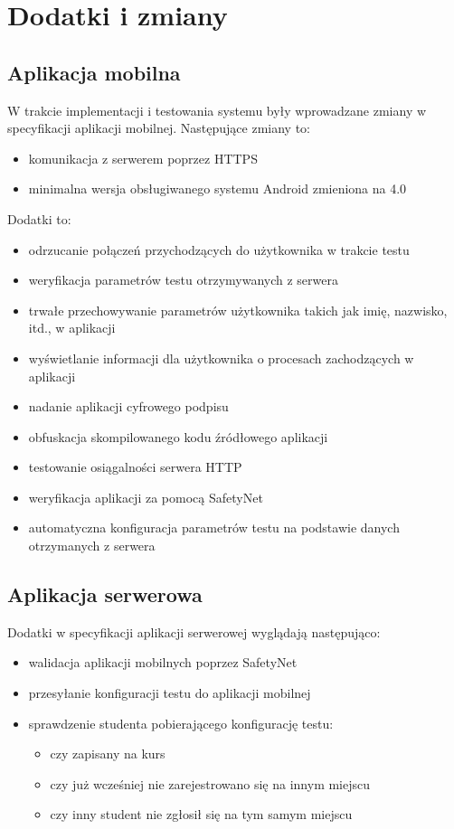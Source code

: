 \documentclass[eng]{mgr}
\begin{document}
		\section{Dodatki i zmiany}
		
			\subsection{Aplikacja mobilna}
			W trakcie implementacji i testowania systemu były wprowadzane zmiany w specyfikacji aplikacji mobilnej. Następujące zmiany to:
			\begin{itemize}
				\item komunikacja z serwerem poprzez HTTPS
				\item minimalna wersja obsługiwanego systemu Android zmieniona na 4.0
			\end{itemize}
			Dodatki to:
			\begin{itemize}
				\item odrzucanie połączeń przychodzących do użytkownika w trakcie testu
				\item weryfikacja parametrów testu otrzymywanych z serwera
				\item trwałe przechowywanie parametrów użytkownika takich jak imię, nazwisko, itd., w aplikacji
				\item wyświetlanie informacji dla użytkownika o procesach zachodzących w aplikacji
				\item nadanie aplikacji cyfrowego podpisu
				\item obfuskacja skompilowanego kodu źródłowego aplikacji
				\item testowanie osiągalności serwera HTTP
				\item weryfikacja aplikacji za pomocą SafetyNet
				\item automatyczna konfiguracja parametrów testu na podstawie danych otrzymanych z serwera
			\end{itemize}
		
			\subsection{Aplikacja serwerowa}
			Dodatki w specyfikacji aplikacji serwerowej wyglądają następująco:
			\begin{itemize}
				\item walidacja aplikacji mobilnych poprzez SafetyNet
				\item przesyłanie konfiguracji testu do aplikacji mobilnej
				\item sprawdzenie studenta pobierającego konfigurację testu:
				\begin{itemize}
					\item czy zapisany na kurs
					\item czy już wcześniej nie zarejestrowano się na innym miejscu
					\item czy inny student nie zgłosił się na tym samym miejscu
				\end{itemize}
			\end{itemize}
		
\end{document}
